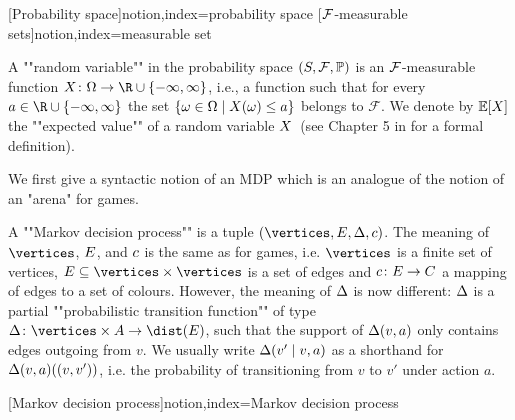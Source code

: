[Probability space]{notion,index={probability space}}
[$\mathcal{F}$-measurable sets]{notion,index={measurable set}}

A ""random variable"" in the probability space $(S,\mathcal{F},\mathbb{P})$ is an $\mathcal{F}$-measurable function $\rvar\colon \Omega \rightarrow \R \cup
\{-\infty,\infty\}$, i.e.,
a function such that for every $a\in \R \cup \{ -\infty,\infty\}$ the set
$\{\omega\in \Omega\mid X(\omega)\leq a\}$ belongs to $\mathcal{F}$. We denote by $\mathbb{E}[X]$ the ""expected value"" of a random variable $X$~(see Chapter 5 in \cite{Billingsley:1995} for a formal definition).


We first give a syntactic notion of an MDP which is an analogue of the notion of an "arena" for games.


\begin{definition}[""MDP""]
\label{5-def:MDP}
A ""Markov decision process"" is a tuple $(\vertices,\edges,\probTranFunc,\colouring)$. The meaning of $\vertices$, $E$, and $c$ is the same as for games, i.e. $\vertices$ is a finite set of vertices, $\edges\subseteq \vertices\times\vertices$ is a set of edges and $c\colon E \rightarrow C$ a mapping of edges to a set of colours. However, the meaning of $\Delta$ is now different: $\Delta$ is a partial ""probabilistic transition function"" of type $\probTranFunc\colon \vertices \times \actions \rightarrow \dist(\edges)$, such that the support of $\Delta(v,a)$ only contains edges outgoing from $v$.
 We usually write $\Delta(v'\mid v,a)$ as a shorthand for $\Delta(v,a)((v,v'))$, i.e. the probability of transitioning from $v$ to $v'$ under action $a$.
\end{definition}

[Markov decision process]{notion,index={Markov decision process}}

